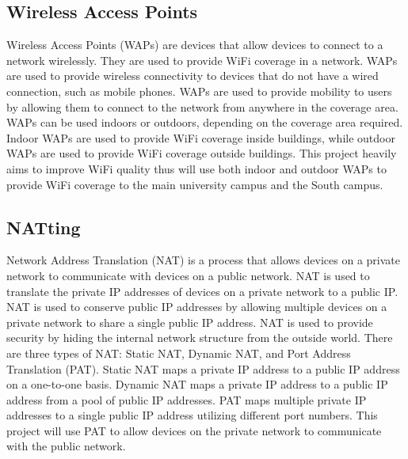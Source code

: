 \documentclass[12pt]{report}
\begin{document}
\subsection{Wireless Access Points}
Wireless Access Points (WAPs) are devices that allow devices to connect to a network wirelessly. They are used to provide WiFi coverage in a network. WAPs are used to provide wireless connectivity to devices that do not have a wired connection, such as mobile phones. WAPs are used to provide mobility to users by allowing them to connect to the network from anywhere in the coverage area. WAPs can be used indoors or outdoors, depending on the coverage area required. Indoor WAPs are used to provide WiFi coverage inside buildings, while outdoor WAPs are used to provide WiFi coverage outside buildings. This project heavily aims to improve WiFi quality thus will use both indoor and outdoor WAPs to provide WiFi coverage to the main university campus and the South campus. %
\subsection{NATting}
Network Address Translation (NAT) is a process that allows devices on a private network to communicate with devices on a public network. NAT is used to translate the private IP addresses of devices on a private network to a public IP. NAT is used to conserve public IP addresses by allowing multiple devices on a private network to share a single public IP address. NAT is used to provide security by hiding the internal network structure from the outside world. There are three types of NAT: Static NAT, Dynamic NAT, and Port Address Translation (PAT). Static NAT maps a private IP address to a public IP address on a one-to-one basis. Dynamic NAT maps a private IP address to a public IP address from a pool of public IP addresses. PAT maps multiple private IP addresses to a single public IP address utilizing different port numbers. This project will use PAT to allow devices on the private network to communicate with the public network. %
\end{document}
